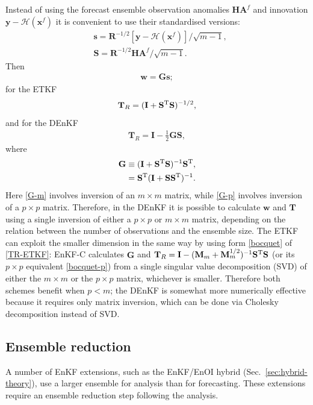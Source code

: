 \documentclass[11pt]{report}
\newcommand{\mb} {\mathbf}
\newcommand{\T}{^{\tiny \mathrm T}}
\begin{document}
Instead of using the forecast ensemble observation anomalies $\mb H \mb A^f$ and innovation $\mb y - \mathcal H(\mb x^f)$ it is convenient to use their standardised versions:
\begin{align}
  \label{s}
  &\mb s = \mb R^{-1/2} \left[ \mb y - \mathcal H(\mb x^f) \right] / \sqrt{m - 1},\\
  \label{S}
  &\mb S = \mb R^{-1/2} \mb H \mb A^f / \sqrt{m - 1}.
\end{align}
Then
\begin{align}
  \label{w-Gs}
  \mb w = \mb G \mb s;
\end{align}
for the ETKF
\begin{align}
  \label{TR-ETKF}
  \mb T_R = (\mb I + \mb S\T \mb S)^{-1/2},
\end{align}
and for the DEnKF
\begin{align}
  \label{TR-DEnKF}
  \mb T_R = \mb I - \frac{1}{2} \mb G \mb S,
\end{align}
where
\begin{align}
  \label{G-m}
  \mb G &\equiv (\mb I + \mb S\T \mb S)^{-1} \mb S\T,\\
  \label{G-p}
  & = \mb S\T ( \mb I + \mb S \mb S\T)^{-1}.
\end{align}
Here \eqref{G-m} involves inversion of an $m \times m$ matrix, while \eqref{G-p} involves inversion of a $p \times p$ matrix.
Therefore, in the DEnKF it is possible to calculate $\mb w$ and $\mb T$ using a single inversion of either a $p \times p$ or $m \times m$ matrix, depending on the relation between the number of observations and the ensemble size.
The ETKF can exploit the smaller dimension in the same way by using form \eqref{bocquet} of \eqref{TR-ETKF}: EnKF-C calculates $\mb G$ and $\mb T_R = \mb I - (\mb M_m + \mb M_m^{1/2})^{-1} \mb S\T \mb S$ (or its $p \times p$ equivalent \eqref{bocquet-p}) from a single singular value decomposition (SVD) of either the $m \times m$ or the $p \times p$ matrix, whichever is smaller.
Therefore both schemes benefit when $p < m$; the DEnKF is somewhat more numerically effective because it requires only matrix inversion, which can be done via Cholesky decomposition instead of SVD.

\subsection{Ensemble reduction}
\label{sec:reduction}

A number of EnKF extensions, such as the EnKF/EnOI hybrid (Sec.~\ref{sec:hybrid-theory}), use a larger ensemble for analysis than for forecasting.
These extensions require an ensemble reduction step following the analysis.
\end{document}
